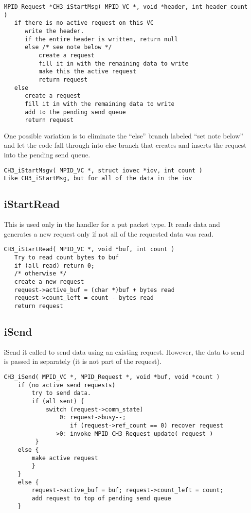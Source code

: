 \documentclass{article}
\begin{document}
\begin{verbatim}
MPID_Request *CH3_iStartMsg( MPID_VC *, void *header, int header_count )
   if there is no active request on this VC
      write the header.
      if the entire header is written, return null
      else /* see note below */
          create a request
          fill it in with the remaining data to write
          make this the active request
          return request               
   else
      create a request
      fill it in with the remaining data to write
      add to the pending send queue
      return request
\end{verbatim}
One possible variation is to eliminate the ``else'' branch labeled ``set note
below'' and let the code fall through into else branch that creates and
inserts the request into the pending send queue.

\begin{verbatim}
CH3_iStartMsgv( MPID_VC *, struct iovec *iov, int count )
Like CH3_iStartMsg, but for all of the data in the iov
\end{verbatim}

\subsection{iStartRead}
This is used only in the handler for a put packet type.  It reads data and
generates a new request only if not all of the requested data was read.

\begin{verbatim}
CH3_iStartRead( MPID_VC *, void *buf, int count )
   Try to read count bytes to buf
   if (all read) return 0;
   /* otherwise */
   create a new request
   request->active_buf = (char *)buf + bytes read
   request->count_left = count - bytes read
   return request
\end{verbatim}

\subsection{iSend}
iSend it called to send data using an existing request.  However, the data to
send is passed in separately (it is not part of the request).
\begin{verbatim}
CH3_iSend( MPID_VC *, MPID_Request *, void *buf, void *count )
    if (no active send requests)
        try to send data.
        if (all sent) {
            switch (request->comm_state)
                0: request->busy--; 
                   if (request->ref_count == 0) recover request
               >0: invoke MPID_CH3_Request_update( request )
         }
    else {
        make active request
        }
    }
    else {
        request->active_buf = buf; request->count_left = count;
        add request to top of pending send queue
    }
\end{verbatim}
\end{document}
